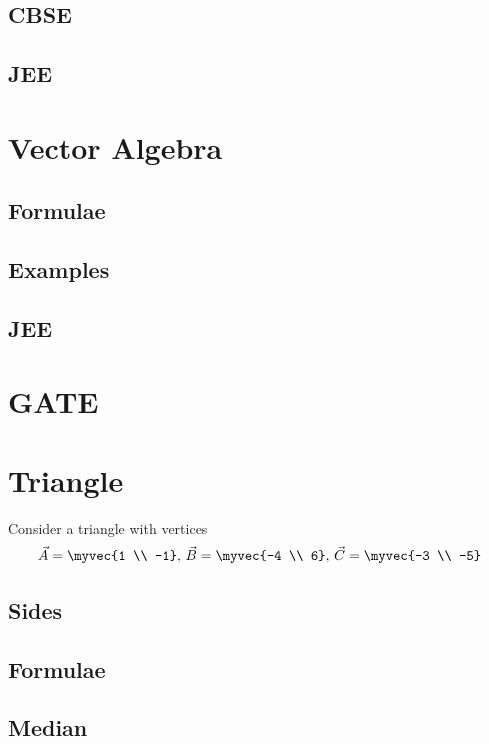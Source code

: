 \documentclass[journal]{IEEEtran}
\begin{document}
\subsection{CBSE}

\subsection{JEE}
 
%
\newpage
\section{Vector Algebra}
\subsection{Formulae}

\subsection{Examples}

\subsection{JEE}
 
\newpage
\section{GATE}

\newpage
\appendices
\section{Triangle}
Consider a triangle with vertices
		\begin{align}
			\label{eq:app-tri-pts}
			\vec{A} = \myvec{1 \\ -1},\,
			\vec{B} = \myvec{-4 \\ 6},\,
			\vec{C} = \myvec{-3 \\ -5}
		\end{align}
\subsection{Sides}

\subsection{Formulae}

\subsection{Median}

\end{document}
